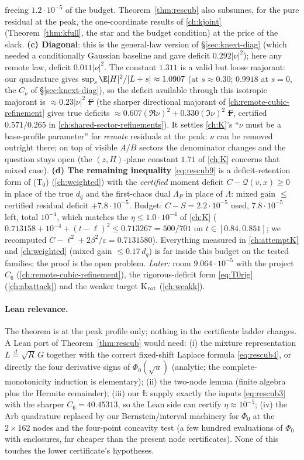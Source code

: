 freeing $1.2\cdot10^{-5}$ of the budget. Theorem~\ref{thm:rescub} also subsumes, for the pure residual at the peak, the one-coordinate results of \autoref{ch:kjoint}
(Theorem~\ref{thm:kfull}, the star and the budget condition) at the price of the slack. \textbf{(c) Diagonal}: this is the general-law version of \S\ref{sec:knext-diag} (which needed a
conditionally Gaussian baseline and gave deficit $0.292|\nu|^2$); here any remote law, deficit $0.011|\nu|^2$. The constant $1.311$ is a valid but loose majorant: our quadrature gives
$\sup_s\E|H|^2/|L+s|\approx1.0907$ (at $s\approx0.30$; $0.9918$ at $s=0$, the $C_\nu$ of \S\ref{sec:knext-diag}), so the deficit available through this isotropic majorant is $\approx0.23|\nu|^2$ \st{F} (the sharper directional majorant of \autoref{ch:remote-cubic-refinement} gives true deficits
$\approx0.607(\Re\nu)^2+0.330(\Im\nu)^2$ \st{F}, certified $0.571/0.265$ in \autoref{ch:shared-sector-refinements}). It settles
\autoref{ch:K}'s ``$\nu$ must be a base-profile parameter'' for \emph{remote} residuals at the peak: $\nu$ can be removed outright there; on top of visible $A/B$ sectors the denominator
changes and the question stays open (the $(z,H)$-plane constant $1.71$ of \autoref{ch:K} concerns that mixed case). \textbf{(d) The remaining inequality} \eqref{eq:rescub9} is a deficit-retention
form of (T$_0$) (\autoref{ch:weighted}) with the \emph{certified} moment deficit $C-\mathcal Q(v,x)\ge0$ in place of the true $d_q$ and the first-chaos dual $\Lambda_P$ in place of $\Lambda$:
mixed gain $\le$ certified residual deficit $+7.8\cdot10^{-5}$. Budget: $C-S=2.2\cdot10^{-5}$ used, $7.8\cdot10^{-5}$ left, total $10^{-4}$, which matches the $\eta\le1.0\cdot10^{-4}$ of
\autoref{ch:K} ($0.713158+10^{-4}+(t-\ell)^2\le0.713267=500/701$ on $t\in[0.84,0.851]$; we recomputed $C-\ell^2+2\beta^2/\varepsilon=0.7131580$). Everything measured in \autoref{ch:attemptK} and
\autoref{ch:weighted} (mixed gain $\le0.17\,d_q$) is far inside this budget on the tested families; the proof is the open problem. \emph{Later:} room $9.064\cdot10^{-5}$ with the project $C_6$
(\autoref{ch:remote-cubic-refinement}), the rigorous-deficit form \eqref{eq:T0rig} (\autoref{ch:abattack}) and the weaker target K$_{\rm rot}$ (\autoref{ch:weakk}).
\paragraph{Lean relevance.} The theorem is at the peak profile only; nothing in the certificate ladder changes. A Lean port of Theorem~\ref{thm:rescub} would need: (i) the mixture
representation $L\overset d=\sqrt R\,G$ together with the correct fixed-shift Laplace formula \eqref{eq:rescub4}, or directly the four derivative signs of $\Phi_0(\sqrt u)$ (analytic; the complete-monotonicity induction is elementary); (ii) the two-node lemma
(finite algebra plus the Hermite remainder); (iii) our  \st{L} supply exactly the inputs \eqref{eq:rescub3} with the sharper $C_6=40.45313$, so the Lean side can certify
$\eta\approx10^{-5}$; (iv) the Arb quadrature replaced by our Bernstein/interval machinery for $\Phi_0$ at the $2\times162$ nodes and the four-point concavity test (a few hundred evaluations of
$\Phi_0$ with enclosures, far cheaper than the present node certificates). None of this touches the lower certificate's hypotheses.
